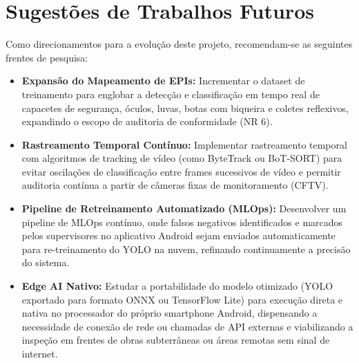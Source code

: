 \section{Sugestões de Trabalhos Futuros}
Como direcionamentos para a evolução deste projeto, recomendam-se as seguintes frentes de pesquisa:
\begin{itemize}
    \item \textbf{Expansão do Mapeamento de EPIs:} Incrementar o dataset de treinamento para englobar a detecção e classificação em tempo real de capacetes de segurança, óculos, luvas, botas com biqueira e coletes reflexivos, expandindo o escopo de auditoria de conformidade (NR 6).
    \item \textbf{Rastreamento Temporal Contínuo:} Implementar rastreamento temporal com algoritmos de tracking de vídeo (como ByteTrack ou BoT-SORT) para evitar oscilações de classificação entre frames sucessivos de vídeo e permitir auditoria contínua a partir de câmeras fixas de monitoramento (CFTV).
    \item \textbf{Pipeline de Retreinamento Automatizado (MLOps):} Desenvolver um pipeline de MLOps contínuo, onde falsos negativos identificados e marcados pelos supervisores no aplicativo Android sejam enviados automaticamente para re-treinamento do YOLO na nuvem, refinando continuamente a precisão do sistema.
    \item \textbf{Edge AI Nativo:} Estudar a portabilidade do modelo otimizado (YOLO exportado para formato ONNX ou TensorFlow Lite) para execução direta e nativa no processador do próprio smartphone Android, dispensando a necessidade de conexão de rede ou chamadas de API externas e viabilizando a inspeção em frentes de obras subterrâneas ou áreas remotas sem sinal de internet.
\end{itemize}
